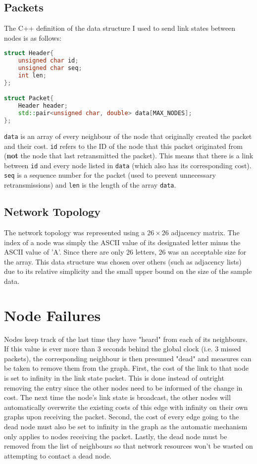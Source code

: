 \documentclass[a4paper]{article}
\begin{document}
\subsection{Packets}

The C++ definition of the data structure I used to send link states between nodes is as follows:
\begin{lstlisting}[language=C++]
struct Header{
	unsigned char id;
	unsigned char seq;
	int len;
};

struct Packet{
	Header header;
	std::pair<unsigned char, double> data[MAX_NODES];
};
\end{lstlisting}

\verb|data| is an array of every neighbour of the node that originally created the packet and their cost.
\verb|id| refers to the ID of the node that this packet originated from (\textbf{not} the node that last retransmitted the
packet). This means that there is a link between \verb|id| and every node listed in \verb|data| (which also has its corresponding
cost). \verb|seq| is a sequence number for the packet (used to prevent unnecessary retransmissions) and \verb|len| is the length 
of the array \verb|data|.

\subsection{Network Topology}
The network topology was represented using a $26 \times 26$ adjacency matrix. The index of a node was simply the ASCII value of
its designated letter minus the ASCII value of 'A'. Since there are only 26 letters, 26 was an acceptable size for the array.
This data structure was chosen over others (such as adjacency lists) due to its relative simplicity and the small upper bound on 
the size of the sample data.

\section{Node Failures}
Nodes keep track of the last time they have "heard" from each of its neighbours. If this value is ever more than 3 seconds behind
the global clock (i.e. 3 missed packets), the corresponding neighbour is then presumed "dead" and measures can be taken to remove
them from the graph. First, the cost of the link to that node is set to infinity in the link state packet. This is done instead
of outright removing the entry since the other nodes need to be informed of the change in cost. The next time the node's link
state is broadcast, the other nodes will automatically overwrite the existing costs of this edge with infinity on their own graphs
upon receiving the packet. Second, the cost of every edge going to the dead node must also be set to infinity in the graph as the 
automatic mechanism only applies to nodes receiving the packet. Lastly, the dead node must be removed from the list of neighbours
so that network resources won't be wasted on attempting to contact a dead node.
\end{document}
